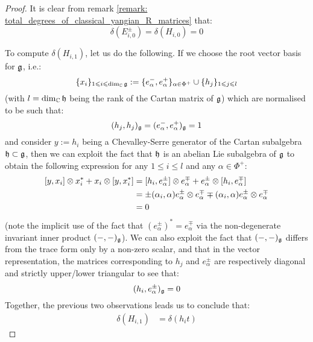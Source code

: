                 \begin{proof}
                    It is clear from remark \ref{remark: total_degrees_of_classical_yangian_R_matrices} that:
                        $$\delta(E_{i, 0}^{\pm}) = \delta(H_{i, 0}) = 0$$
                
                    To compute $\delta(H_{i, 1})$, let us do the following. If we choose the root vector basis for $\g$, i.e.:
                        $$\{x_i\}_{1 \leq i \leq \dim_{\bbC} \g} := \{e_{\alpha}^-, e_{\alpha}^+\}_{\alpha \in \Phi^+} \cup \{h_j\}_{1 \leq j \leq l}$$
                    (with $l = \dim_{\bbC} \h$ being the rank of the Cartan matrix of $\g$) which are normalised to be such that:
                        $$(h_j, h_j)_{\g} = (e_{\alpha}^-, e_{\alpha}^+)_{\g} = 1$$
                    and consider $y := h_i$ being a Chevalley-Serre generator of the Cartan subalgebra $\h \subset \g$, then we can exploit the fact that $\h$ is an abelian Lie subalgebra of $\g$ to obtain the following expression for any $1 \leq i \leq l$ and any $\alpha \in \Phi^+$:
                        $$
                            \begin{aligned}
                                [y, x_i] \tensor x_i^* + x_i \tensor [y, x_i^*] & = [h_i, e_{\alpha}^{\pm}] \tensor e_{\alpha}^{\mp} + e_{\alpha}^{\pm} \tensor [h_i, e_{\alpha}^{\mp}]
                                \\
                                & = \pm (\alpha_i, \alpha) e_{\alpha}^{\pm} \tensor e_{\alpha}^{\mp} \mp (\alpha_i, \alpha) e_{\alpha}^{\pm} \tensor e_{\alpha}^{\mp}
                                \\
                                & = 0
                            \end{aligned}
                        $$
                    (note the implicit use of the fact that $(e_{\alpha}^{\pm})^* = e_{\alpha}^{\mp}$ via the non-degenerate invariant inner product $(-, -)_{\g}$). We can also exploit the fact that $(-, -)_{\g}$ differs from the trace form only by a non-zero scalar, and that in the vector representation, the matrices corresponding to $h_j$ and $e_{\alpha}^{\pm}$ are respectively diagonal and strictly upper/lower triangular to see that:
                        $$(h_i, e_{\alpha}^{\pm})_{\g} = 0$$
                    Together, the previous two observations leads us to conclude that:
                        $$
                            \begin{aligned}
                                \delta(H_{i, 1}) & = \delta(h_i t)

\end{aligned}$$
\end{proof}
